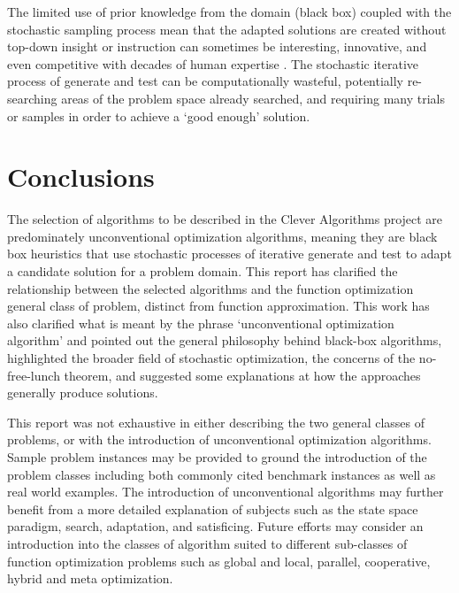 \documentclass[a4paper, 11pt]{article}
\begin{document}
The limited use of prior knowledge from the domain (black box) coupled with the stochastic sampling process mean that the adapted solutions are created without top-down insight or instruction can sometimes be interesting, innovative, and even competitive with decades of human expertise \cite{Koza2003}. The stochastic iterative process of generate and test can be computationally wasteful, potentially re-searching areas of the problem space already searched, and requiring many trials or samples in order to achieve a `good enough' solution.

% 
% 
\section{Conclusions}
\label{sec:conclusions}
The selection of algorithms to be described in the Clever Algorithms project are predominately unconventional optimization algorithms, meaning they are black box heuristics that use stochastic processes of iterative generate and test to adapt a candidate solution for a problem domain.
This report has clarified the relationship between the selected algorithms and the function optimization general class of problem, distinct from function approximation. This work has also clarified what is meant by the phrase `unconventional optimization algorithm' and pointed out the general philosophy behind black-box algorithms, highlighted the broader field of stochastic optimization, the concerns of the no-free-lunch theorem, and suggested some explanations at how the approaches generally produce solutions.

This report was not exhaustive in either describing the two general classes of problems, or with the introduction of unconventional optimization algorithms. 
Sample problem instances may be provided to ground the introduction of the problem classes including both commonly cited benchmark instances as well as real world examples.
The introduction of unconventional algorithms may further benefit from a more detailed explanation of subjects such as the state space paradigm, search, adaptation, and satisficing. Future efforts may consider an introduction into the classes of algorithm suited to different sub-classes of function optimization problems such as global and local, parallel, cooperative, hybrid and meta optimization.



\end{document}
